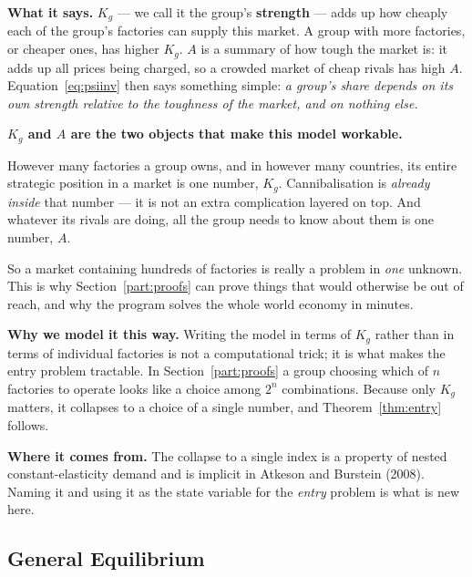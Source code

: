 \documentclass[11pt]{article}
\newenvironment{keypoint}
  {\begin{lrbox}{\kbox}\begin{minipage}{0.93\textwidth}\vspace{3pt}}
  {\vspace{3pt}\end{minipage}\end{lrbox}\begin{center}\fbox{\usebox{\kbox}}\end{center}}
\newcommand{\says}[1]{\smallskip\noindent\textbf{What it says.} #1\smallskip}
\newcommand{\why}[1]{\smallskip\noindent\textbf{Why we model it this way.} #1\smallskip}
\newcommand{\from}[1]{\smallskip\noindent\textbf{Where it comes from.} #1\smallskip}
\theoremstyle{plain}
\theoremstyle{remark}
\theoremstyle{definition}
\begin{document}
\says{$K_g$ --- we call it the group's \textbf{strength} --- adds up how cheaply each
of the group's factories can supply this market. A group with more factories, or
cheaper ones, has higher $K_g$. $A$ is a summary of how tough the market is: it adds
up all prices being charged, so a crowded market of cheap rivals has high $A$.
Equation~\eqref{eq:psiinv} then says something simple: \emph{a group's share depends
on its own strength relative to the toughness of the market, and on nothing else.}}

\begin{keypoint}
\textbf{$K_g$ and $A$ are the two objects that make this model workable.}

However many factories a group owns, and in however many countries, its entire
strategic position in a market is one number, $K_g$. Cannibalisation is \emph{already
inside} that number --- it is not an extra complication layered on top. And whatever
its rivals are doing, all the group needs to know about them is one number, $A$.

So a market containing hundreds of factories is really a problem in \emph{one}
unknown. This is why Section~\ref{part:proofs} can prove things that would otherwise be out of reach,
and why the program solves the whole world economy in minutes.
\end{keypoint}

\why{Writing the model in terms of $K_g$ rather than in terms of individual factories
is not a computational trick; it is what makes the entry problem tractable. In
Section~\ref{part:proofs} a group choosing which of $n$ factories to operate looks like a choice among
$2^n$ combinations. Because only $K_g$ matters, it collapses to a choice of a single
number, and Theorem~\ref{thm:entry} follows.}

\from{The collapse to a single index is a property of nested constant-elasticity
demand and is implicit in Atkeson and Burstein (2008). Naming it and using it as the
state variable for the \emph{entry} problem is what is new here.}

\subsection{General Equilibrium}
\end{document}
